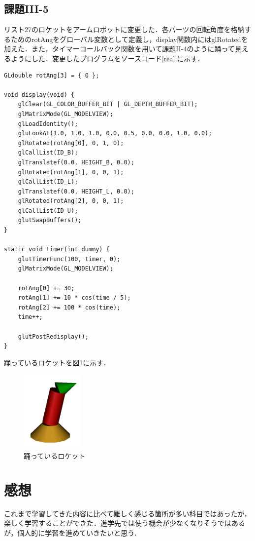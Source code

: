\documentclass[]{jsarticle}
\begin{document}
\subsection{課題III-5}
リスト27のロケットをアームロボットに変更した．各パーツの回転角度を格納するためのrotAngをグローバル変数として定義し，display関数内にはglRotatedを加えた．また，タイマーコールバック関数を用いて課題II-4のように踊って見えるようにした．変更したプログラムをソースコード\ref{real}に示す．
\begin{lstlisting}[caption=リスト27の変更部分,label=real]
GLdouble rotAng[3] = { 0 };

void display(void) {
	glClear(GL_COLOR_BUFFER_BIT | GL_DEPTH_BUFFER_BIT);
	glMatrixMode(GL_MODELVIEW);
	glLoadIdentity();
	gluLookAt(1.0, 1.0, 1.0, 0.0, 0.5, 0.0, 0.0, 1.0, 0.0);
	glRotated(rotAng[0], 0, 1, 0);
	glCallList(ID_B);
	glTranslatef(0.0, HEIGHT_B, 0.0);
	glRotated(rotAng[1], 0, 0, 1);
	glCallList(ID_L);
	glTranslatef(0.0, HEIGHT_L, 0.0);
	glRotated(rotAng[2], 0, 0, 1);
	glCallList(ID_U);
	glutSwapBuffers();
}

static void timer(int dummy) {
	glutTimerFunc(100, timer, 0);
	glMatrixMode(GL_MODELVIEW);

	rotAng[0] += 30;
	rotAng[1] += 10 * cos(time / 5);
	rotAng[2] += 100 * cos(time);
	time++;

	glutPostRedisplay();
}
\end{lstlisting}

踊っているロケットを図\ref{fig:rdance}に示す．

\begin{figure}[htbp]
\begin{center}
\includegraphics[height=4cm,keepaspectratio]{rdance.jpg}
    \caption{踊っているロケット}
    \label{fig:rdance}
\end{center}
\end{figure}

\section{感想}
これまで学習してきた内容に比べて難しく感じる箇所が多い科目ではあったが，楽しく学習することができた．進学先では使う機会が少なくなりそうではあるが，個人的に学習を進めていきたいと思う．
\end{document}
